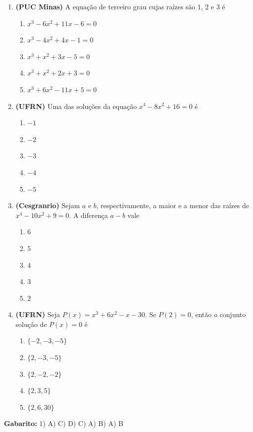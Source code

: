\documentclass[12pt,a4paper]{article}
\begin{document}
\begin{enumerate}
    \vspace{0.3cm}

    \item \textbf{(PUC Minas)} A equação de terceiro grau cujas raízes são $1$, $2$ e $3$ é
    \begin{enumerate}
        \item $x^3 - 6x^2 + 11x - 6 = 0$
        \item $x^3 - 4x^2 + 4x - 1 = 0$
        \item $x^3 + x^2 + 3x - 5 = 0$
        \item $x^3 + x^2 + 2x + 3 = 0$
        \item $x^3 + 6x^2 - 11x + 5 = 0$
    \end{enumerate}

    \vspace{0.3cm}

    \item \textbf{(UFRN)} Uma das soluções da equação $x^4 - 8x^2 + 16 = 0$ é
    \begin{enumerate}
        \item $-1$
        \item $-2$
        \item $-3$
        \item $-4$
        \item $-5$
    \end{enumerate}

    \vspace{0.3cm}

    \item \textbf{(Cesgranrio)} Sejam $a$ e $b$, respectivamente, a maior e a menor das raízes de $x^4 - 10x^2 + 9 = 0$. A diferença $a - b$ vale
    \begin{enumerate}
        \item $6$
        \item $5$
        \item $4$
        \item $3$
        \item $2$
    \end{enumerate}

    \vspace{0.3cm}

    \item \textbf{(UFRN)} Seja $P(x) = x^3 + 6x^2 - x - 30$. Se $P(2) = 0$, então o conjunto solução de $P(x) = 0$ é
    \begin{enumerate}
        \item $\{-2, -3, -5\}$
        \item $\{2, -3, -5\}$
        \item $\{2, -2, -2\}$
        \item $\{2, 3, 5\}$
        \item $\{2, 6, 30\}$
    \end{enumerate}
\end{enumerate}

\textbf{Gabarito:} 1) A) C) D) C) A) B) A) B\quad 
\end{document}

